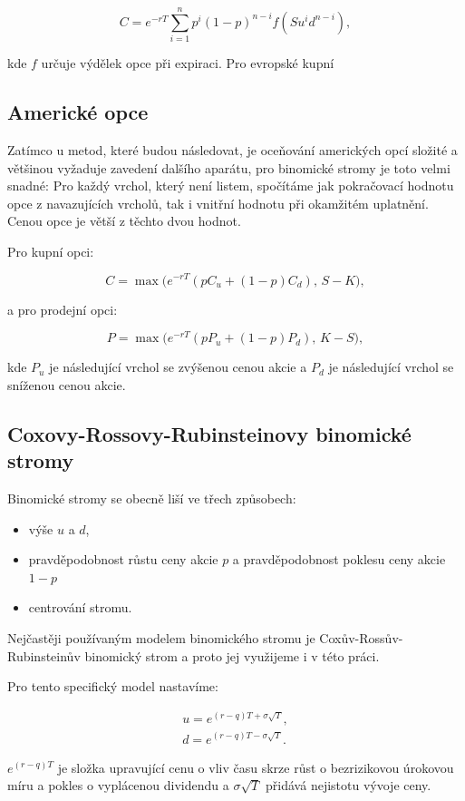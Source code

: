 \documentclass{article}
\begin{document}
\begin{equation}
  C = e^{-rT} \sum_{i=1}^{n} p^i (1 - p)^{n - i} f(S u^i d^{n-i}),
\end{equation}

kde $f$ určuje výdělek opce při expiraci. Pro evropské kupní 


\subsection{Americké opce}

Zatímco u metod, které budou následovat, je oceňování amerických opcí složité a většinou vyžaduje zavedení dalšího aparátu, pro binomické stromy je toto velmi snadné: Pro každý vrchol, který není listem, spočítáme jak pokračovací hodnotu opce z navazujících vrcholů, tak i vnitřní hodnotu při okamžitém uplatnění. Cenou opce je větší z těchto dvou hodnot.

Pro kupní opci:

\begin{equation}
  C = \max\!\bigl(e^{-rT}(p C_u + (1-p) C_d),\, S - K\bigr),
\end{equation}

a pro prodejní opci:

\begin{equation}
  P = \max\!\bigl(e^{-rT}(p P_u + (1-p) P_d),\, K - S\bigr),
\end{equation}

kde $P_u$ je následující vrchol se zvýšenou cenou akcie a $P_d$ je následující vrchol se sníženou cenou akcie.

\subsection{Coxovy-Rossovy-Rubinsteinovy binomické stromy}

Binomické stromy se obecně liší ve třech způsobech: %

\begin{itemize}
  \item výše $u$ a $d$,
  \item pravděpodobnost růstu ceny akcie $p$ a pravděpodobnost poklesu ceny akcie $1 - p$
  \item centrování stromu.
\end{itemize}

Nejčastěji používaným modelem binomického stromu je Coxův-Rossův-Rubinsteinův binomický strom \citep[Kapitola~13]{McDonald2013} \citep[Kapitola~13]{Hull2021} a proto jej využijeme i v této práci.

Pro tento specifický model nastavíme:

\begin{gather}
  u = e^{(r - q)T + \sigma \sqrt{T}}, \\
  d = e^{(r - q)T - \sigma \sqrt{T}}.
\end{gather}

$e^{(r - q)T}$ je složka upravující cenu o vliv času skrze růst o bezrizikovou úrokovou míru a pokles o vyplácenou dividendu a $\sigma \sqrt{T}$ přidává nejistotu vývoje ceny. \citep[Kapitola~13]{McDonald2013}
\end{document}
